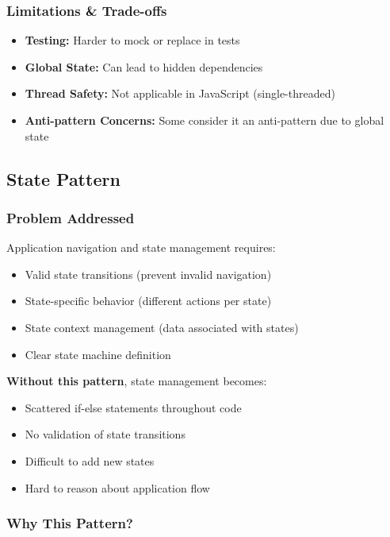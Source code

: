 \documentclass[11pt, a4paper]{article}
\theoremstyle{plain}
\theoremstyle{definition}
\begin{document}
\subsubsection{Limitations \& Trade-offs}

\begin{itemize}
    \item \textbf{Testing:} Harder to mock or replace in tests
    \item \textbf{Global State:} Can lead to hidden dependencies
    \item \textbf{Thread Safety:} Not applicable in JavaScript (single-threaded)
    \item \textbf{Anti-pattern Concerns:} Some consider it an anti-pattern due to global state
\end{itemize}

\subsection{State Pattern}

\subsubsection{Problem Addressed}

Application navigation and state management requires:
\begin{itemize}
    \item Valid state transitions (prevent invalid navigation)
    \item State-specific behavior (different actions per state)
    \item State context management (data associated with states)
    \item Clear state machine definition
\end{itemize}

\textbf{Without this pattern}, state management becomes:
\begin{itemize}
    \item Scattered if-else statements throughout code
    \item No validation of state transitions
    \item Difficult to add new states
    \item Hard to reason about application flow
\end{itemize}

\subsubsection{Why This Pattern?}
\end{document}
